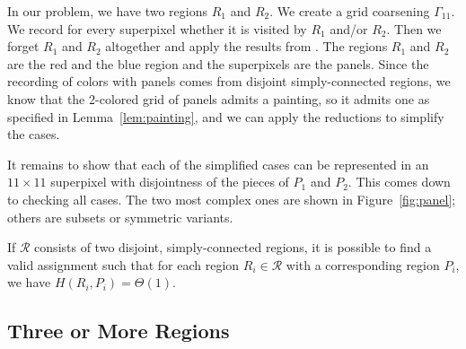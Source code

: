 \documentclass[a4paper,UKenglish,cleveref]{lipics-v2019}
\begin{document}
In our problem, we have two regions $R_1$ and $R_2$. We create a grid coarsening $\Gamma_{11}$. We record for every superpixel whether it is visited by $R_1$ and/or $R_2$. 
Then we forget $R_1$ and $R_2$ altogether and apply the results from \cite{goethem2017painter}. The regions $R_1$ and $R_2$ are the red and the blue region and the superpixels are the panels. Since the recording of colors with panels comes from disjoint simply-connected regions, we know that the 2-colored grid of panels admits a painting, so it admits one as specified in Lemma~\ref{lem:painting}, and we can apply the reductions to simplify the cases.

It remains to show that each of the simplified cases can be represented in an $11\times 11$ superpixel with disjointness of the pieces of $P_1$ and $P_2$. This comes down to checking all cases. The two most complex ones are shown in Figure~\ref{fig:panel}; others are subsets or symmetric variants.

\begin{theorem}
If $\mathcal{R}$ consists of two disjoint, simply-connected regions, it is possible to find a valid assignment such that for each region $R_i \in \mathcal{R}$ with a corresponding region $P_i$, we have $H(R_i, P_i) = \Theta(1)$.
\end{theorem}



\subsection{Three or More Regions}
\label{subsec:three}
\end{document}
